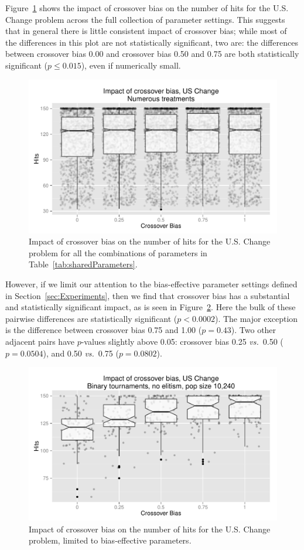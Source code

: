 \documentclass{sig-alternate}
\begin{document}
Figure~\ref{fig:USChange_Hits} shows the impact of crossover bias on the number of hits for the U.S. Change problem
across the full collection of parameter settings. This suggests that in general there is little consistent impact of
crossover bias; while most of the differences in this plot are not statistically significant, two are: the differences
between crossover bias 0.00 and crossover bias 0.50 and 0.75 are both statistically significant ($p \leq 0.015$), even
if numerically small.

\begin{figure}[tb]
\centering
\includegraphics[width=0.45 \textwidth]{Plots/US_change_hits.pdf}
\caption{Impact of crossover bias on the number of hits for the U.S. Change problem for all the combinations 
	of parameters in Table~\ref{tab:sharedParameters}.}
\label{fig:USChange_Hits}
\end{figure}

%
%
%
%

However, if we limit our attention to the bias-effective parameter settings defined in Section~\ref{sec:Experiments}, then we
find that crossover bias has a substantial and statistically significant impact, as is seen in
Figure~\ref{fig:USChange_Hits_strong}. Here the bulk of these pairwise differences are statistically significant
($p<0.0002$). The major exception is the difference between crossover bias 0.75 and 1.00 ($p=0.43$). Two other
adjacent pairs have $p$-values slightly above 0.05: crossover bias 0.25 \emph{vs.}\ 0.50 ($p=0.0504$), and 0.50
\emph{vs.}\ 0.75 ($p=0.0802$).

\begin{figure}[tb]
\centering
\includegraphics[width=0.45 \textwidth]{Plots/US_change_hits_strong.pdf}
\caption{Impact of crossover bias on the number of hits for the U.S. Change problem, limited to bias-effective
parameters.}
\label{fig:USChange_Hits_strong}
\end{figure}
\end{document}
